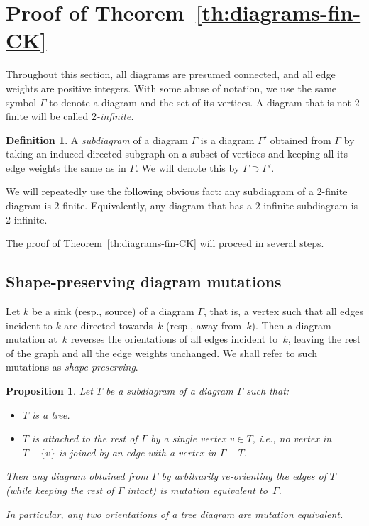 \documentclass[letterpaper]{amsart}
\numberwithin{equation}{section}
\newtheorem{proposition}[theorem]{Proposition}
\theoremstyle{definition}
\newtheorem{definition}[theorem]{Definition}
\begin{document}
 
\pagebreak[3] 
 
 
 
 
\section{Proof of Theorem~\ref{th:diagrams-fin-CK}} 
\label{sec:diagram-CK-proof} 
 
Throughout this section, all diagrams are presumed connected, and 
all edge weights are positive integers. 
With some abuse of notation, we use the same symbol $\Gamma$ to denote 
a diagram and the set of its vertices. 
A diagram that is not $2$-finite will be called \emph{$2$-infinite.} 
 
\begin{definition} 
A \emph{subdiagram} of a diagram $\Gamma$ is a diagram $\Gamma'$ 
obtained from $\Gamma$ by taking an induced directed subgraph on a subset of vertices and 
keeping all its edge weights the same as in $\Gamma$. 
We will denote this by $\Gamma\supset \Gamma'$. 
\end{definition} 
 
We will repeatedly use the following obvious fact: 
any subdiagram of a $2$-finite diagram is $2$-finite. 
Equivalently, any diagram that has a $2$-infinite subdiagram is 
$2$-infinite. 
 
 
The proof of Theorem~\ref{th:diagrams-fin-CK} will proceed in 
several steps. 
 
 
\subsection{Shape-preserving diagram mutations} 
Let $k$ be a sink (resp., source) of a diagram $\Gamma$, 
that is, a vertex such that all edges incident to $k$ 
are directed towards~$k$ (resp., away from~$k$). 
Then a diagram mutation at~$k$ reverses the orientations of 
all edges incident to~$k$, leaving the rest of the graph and 
all the edge weights unchanged. 
We shall refer to such mutations as \emph{shape-preserving}. 
 
\begin{proposition} 
\label{pr:tree-orientations} 
Let $T$ be a subdiagram of a diagram $\Gamma$ such that: 
\begin{itemize} 
\item[{\rm (i)}] $T$ is a tree. 
 
\item[{\rm (ii)}] $T$ is attached to the rest of $\Gamma$ by a single 
vertex $v \in T$, i.e., no vertex in $T - \{v\}$ is joined by an 
edge with a vertex in $\Gamma - T$. 
\end{itemize} 
Then any diagram obtained from $\Gamma$ by arbitrarily re-orienting 
the edges of $T$ (while keeping the rest of $\Gamma$ intact) 
is mutation equivalent to~$\Gamma$. 
 
In particular, any two orientations of a tree diagram are 
mutation equivalent. 
\end{proposition} 
 
\end{document}
